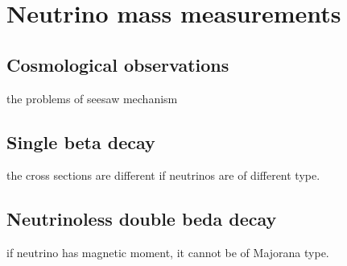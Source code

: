 \section{Neutrino mass measurements}
\label{sec:others}

\subsection{Cosmological observations}
\label{sec:seesaw}
the problems of seesaw mechanism

\subsection{Single beta decay}
\label{sec:pair}
the cross sections are different if neutrinos are of different type.

\subsection{Neutrinoless double beda decay}
\label{sec:mag}
if neutrino has magnetic moment, it cannot be of Majorana type.

